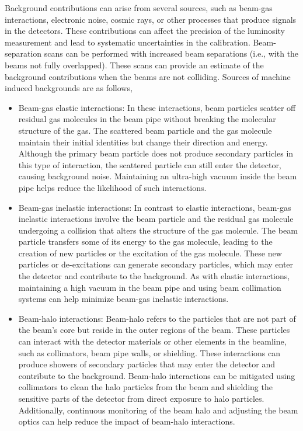 Background contributions can arise from several sources, such as beam-gas interactions, electronic noise, cosmic rays, or other processes that produce signals in the detectors. These contributions can affect the precision of the luminosity measurement and lead to systematic uncertainties in the calibration. Beam-separation scans can be performed with increased beam separations (i.e., with the beams not fully overlapped). These scans can provide an estimate of the background contributions when the beams are not colliding. Sources of machine induced backgrounds are as follows,

\begin{itemize}

\item Beam-gas elastic interactions: In these interactions, beam particles scatter off residual gas molecules in the beam pipe without breaking the molecular structure of the gas. The scattered beam particle and the gas molecule maintain their initial identities but change their direction and energy. Although the primary beam particle does not produce secondary particles in this type of interaction, the scattered particle can still enter the detector, causing background noise. Maintaining an ultra-high vacuum inside the beam pipe helps reduce the likelihood of such interactions.

\item Beam-gas inelastic interactions: In contrast to elastic interactions, beam-gas inelastic interactions involve the beam particle and the residual gas molecule undergoing a collision that alters the structure of the gas molecule. The beam particle transfers some of its energy to the gas molecule, leading to the creation of new particles or the excitation of the gas molecule. These new particles or de-excitations can generate secondary particles, which may enter the detector and contribute to the background. As with elastic interactions, maintaining a high vacuum in the beam pipe and using beam collimation systems can help minimize beam-gas inelastic interactions.

\item Beam-halo interactions: Beam-halo refers to the particles that are not part of the beam's core but reside in the outer regions of the beam. These particles can interact with the detector materials or other elements in the beamline, such as collimators, beam pipe walls, or shielding. These interactions can produce showers of secondary particles that may enter the detector and contribute to the background. Beam-halo interactions can be mitigated using collimators to clean the halo particles from the beam and shielding the sensitive parts of the detector from direct exposure to halo particles. Additionally, continuous monitoring of the beam halo and adjusting the beam optics can help reduce the impact of beam-halo interactions.

\end{itemize}


